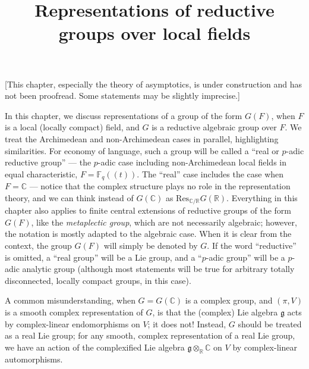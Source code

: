

%


\title{Representations of reductive groups over local fields}


\maketitle

\label{section-phantom}


\tableofcontents

[This chapter, especially the theory of asymptotics, is under construction and has not been proofread. Some statements may be slightly imprecise.]

In this chapter, we discuss representations of a group of the form $G(F)$, when $F$ is a local (locally compact) field, and $G$ is a reductive algebraic group over $F$. We treat the Archimedean and non-Archimedean cases in parallel, highlighting similarities. For economy of language, such a group will be called a ``real or $p$-adic reductive group'' --- the $p$-adic case including non-Archimedean local fields in equal characteristic, $F=\mathbb F_q((t))$. The ``real'' case includes the case when $F=\mathbb C$ --- notice that the complex structure plays no role in the representation theory, and we can think instead of $G(\mathbb C)$ as $\text{Res}_{\mathbb C/\mathbb R} G(\mathbb R)$. Everything in this chapter also applies to finite central extensions of reductive groups of the form $G(F)$, like the \emph{metaplectic group}, which are not necessarily algebraic; however, the notation is mostly adapted to the algebraic case.  When it is clear from the context, the group $G(F)$ will simply be denoted by $G$. If the word ``reductive'' is omitted, a ``real group'' will be a Lie group, and a ``$p$-adic group'' will be a $p$-adic analytic group (although most statements will be true for arbitrary totally disconnected, locally compact groups, in this case).

\begin{remark}
 \label{remark-complexification-Lie-algebra}
A common misunderstanding, when $G=G(\mathbb C)$ is a complex group, and $(\pi,V)$ is a smooth complex representation of $G$, is that the (complex) Lie algebra $\mathfrak g$ acts by complex-linear endomorphisms on $V$; it does not! Instead, $G$ should be treated as a real Lie group; for any smooth, complex representation of a real Lie group, we have an action of the complexified Lie algebra $\mathfrak g\otimes_{\mathbb R} \mathbb C$ on $V$ by complex-linear automorphisms.
\end{remark}


